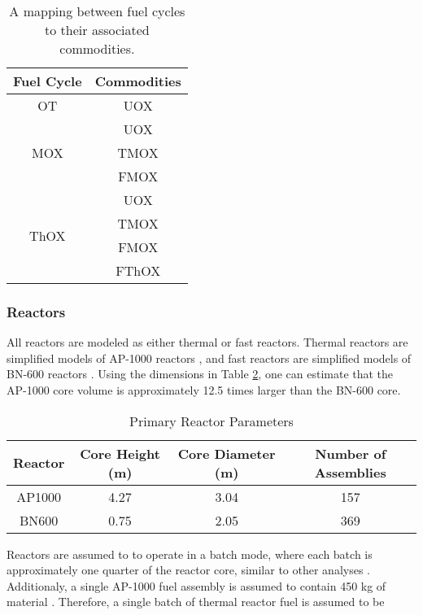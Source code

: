 \begin{table}[h]
\centering
\caption{A mapping between fuel cycles to their associated commodities.}
\label{tbl:fc_to_commods}
\begin{tabular}{|c|c|}
\hline
Fuel Cycle            & Commodities \\ \hline
OT                    & UOX         \\ \hline
\multirow{3}{*}{MOX}  & UOX         \\  
                      & TMOX        \\  
                      & FMOX        \\ \hline
\multirow{4}{*}{ThOX} & UOX         \\  
                      & TMOX        \\  
                      & FMOX        \\  
                      & FThOX       \\ \hline
\end{tabular}
\end{table}

\subsubsection{Reactors}

All reactors are modeled as either thermal or fast reactors. Thermal reactors
are simplified models of AP-1000 reactors \cite{ARIS}, and fast reactors are
simplified models of BN-600 reactors \cite{reactors2007experience}. Using the
dimensions in Table \ref{tbl:rxtr_params}, one can estimate that the AP-1000 core
volume is approximately 12.5 times larger than the BN-600 core. 

\begin{table}[h]
\centering
\caption{Primary Reactor Parameters}
\label{tbl:rxtr_params}
\begin{tabular}{|c|c|c|c|}
\hline
Reactor & Core Height (m) & Core Diameter (m) & Number of Assemblies \\ \hline
AP1000  & 4.27            & 3.04              & 157 \\ \hline
BN600   & 0.75            & 2.05              & 369 \\ \hline
\end{tabular}
\end{table}

Reactors are assumed to to operate in a batch mode, where each batch is
approximately one quarter of the reactor core, similar to other analyses
\cite{rineiski2011reactivity}. Additionaly, a single AP-1000 fuel assembly is
assumed to contain 450 kg of material \cite{kok2009nuclear}. Therefore, a single
batch of thermal reactor fuel is assumed to be


